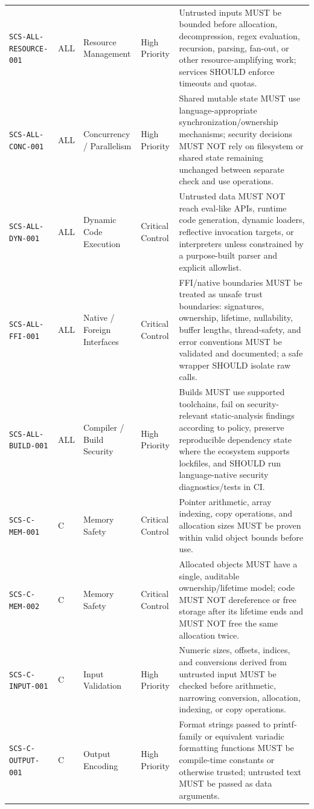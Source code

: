 \documentclass[10pt,letterpaper]{article}
\newcommand{\code}[1]{\begingroup\small\ttfamily\def\UrlFont{\ttfamily}\nolinkurl{#1}\endgroup}
\begin{document}
\begin{landscape}
\begin{longtable}{@{}P{1.3in}P{0.8in}P{1.45in}P{1.0in}P{4.65in}@{}}
\code{SCS-ALL-RESOURCE-001} & ALL & Resource Management & High Priority & Untrusted inputs MUST be bounded before allocation, decompression, regex evaluation, recursion, parsing, fan-out, or other resource-amplifying work; services SHOULD enforce timeouts and quotas.\\
\code{SCS-ALL-CONC-001} & ALL & Concurrency / Parallelism & High Priority & Shared mutable state MUST use language-appropriate synchronization/ownership mechanisms; security decisions MUST NOT rely on filesystem or shared state remaining unchanged between separate check and use operations.\\
\code{SCS-ALL-DYN-001} & ALL & Dynamic Code Execution & Critical Control & Untrusted data MUST NOT reach eval-like APIs, runtime code generation, dynamic loaders, reflective invocation targets, or interpreters unless constrained by a purpose-built parser and explicit allowlist.\\
\code{SCS-ALL-FFI-001} & ALL & Native / Foreign Interfaces & Critical Control & FFI/native boundaries MUST be treated as unsafe trust boundaries: signatures, ownership, lifetime, nullability, buffer lengths, thread-safety, and error conventions MUST be validated and documented; a safe wrapper SHOULD isolate raw calls.\\
\code{SCS-ALL-BUILD-001} & ALL & Compiler / Build Security & High Priority & Builds MUST use supported toolchains, fail on security-relevant static-analysis findings according to policy, preserve reproducible dependency state where the ecosystem supports lockfiles, and SHOULD run language-native security diagnostics/tests in CI.\\
\code{SCS-C-MEM-001} & C & Memory Safety & Critical Control & Pointer arithmetic, array indexing, copy operations, and allocation sizes MUST be proven within valid object bounds before use.\\
\code{SCS-C-MEM-002} & C & Memory Safety & Critical Control & Allocated objects MUST have a single, auditable ownership/lifetime model; code MUST NOT dereference or free storage after its lifetime ends and MUST NOT free the same allocation twice.\\
\code{SCS-C-INPUT-001} & C & Input Validation & High Priority & Numeric sizes, offsets, indices, and conversions derived from untrusted input MUST be checked before arithmetic, narrowing conversion, allocation, indexing, or copy operations.\\
\code{SCS-C-OUTPUT-001} & C & Output Encoding & High Priority & Format strings passed to printf-family or equivalent variadic formatting functions MUST be compile-time constants or otherwise trusted; untrusted text MUST be passed as data arguments.\\

\end{longtable}
\end{landscape}
\end{document}
